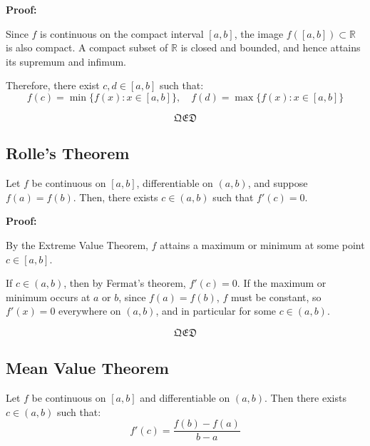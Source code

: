 \textbf{Proof:}  

Since \( f \) is continuous on the compact interval \([a, b]\), the image \( f([a, b]) \subset \mathbb{R} \) is also compact. A compact subset of \( \mathbb{R} \) is closed and bounded, and hence attains its supremum and infimum.

Therefore, there exist \( c, d \in [a, b] \) such that:
\[
f(c) = \min\{f(x): x \in [a, b]\}, \quad
f(d) = \max\{f(x): x \in [a, b]\}
\]

\[\mathfrak{QED}\]


\subsection{Rolle’s Theorem}

Let \( f \) be continuous on \([a, b] \), differentiable on \((a, b) \), and suppose \( f(a) = f(b) \).  
Then, there exists \( c \in (a, b) \) such that \( f'(c) = 0 \).

\textbf{Proof:}  

By the Extreme Value Theorem, \( f \) attains a maximum or minimum at some point \( c \in [a, b] \).

If \( c \in (a, b) \), then by Fermat’s theorem, \( f'(c) = 0 \).  
If the maximum or minimum occurs at \( a \) or \( b \), since \( f(a) = f(b) \), \( f \) must be constant, so \( f'(x) = 0 \) everywhere on \((a, b)\), and in particular for some \( c \in (a, b) \).

\[\mathfrak{QED}\]

\begin{center}
\end{center}



\subsection{Mean Value Theorem}

Let \( f \) be continuous on \([a, b] \) and differentiable on \((a, b) \).  
Then there exists \( c \in (a, b) \) such that:
\[
f'(c) = \frac{f(b) - f(a)}{b - a}
\]

